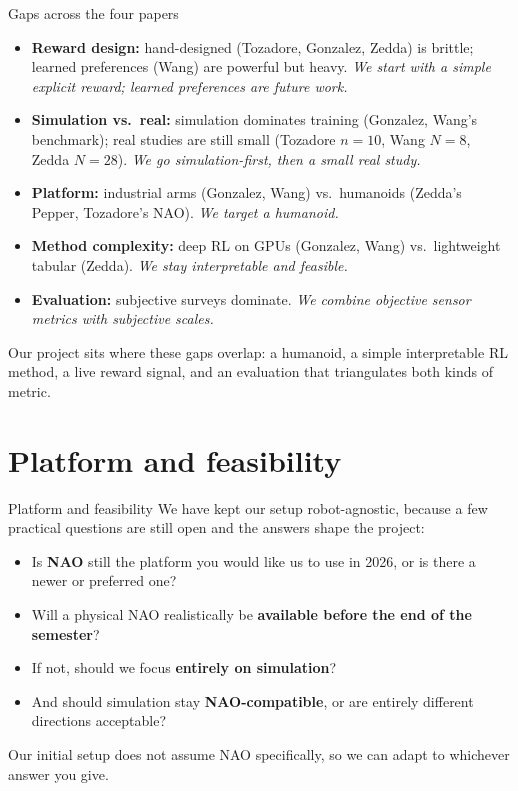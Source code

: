 \documentclass[aspectratio=169,10pt]{beamer}
\begin{document}
\begin{frame}{Gaps across the four papers}
  \footnotesize
  \begin{itemize}
    \item \textbf{Reward design:} hand-designed (Tozadore, Gonzalez, Zedda) is brittle; learned preferences (Wang) are powerful but heavy. \emph{We start with a simple explicit reward; learned preferences are future work.}
    \item \textbf{Simulation vs.\ real:} simulation dominates training (Gonzalez, Wang's benchmark); real studies are still small (Tozadore $n{=}10$, Wang $N{=}8$, Zedda $N{=}28$). \emph{We go simulation-first, then a small real study.}
    \item \textbf{Platform:} industrial arms (Gonzalez, Wang) vs.\ humanoids (Zedda's Pepper, Tozadore's NAO). \emph{We target a humanoid.}
    \item \textbf{Method complexity:} deep RL on GPUs (Gonzalez, Wang) vs.\ lightweight tabular (Zedda). \emph{We stay interpretable and feasible.}
    \item \textbf{Evaluation:} subjective surveys dominate. \emph{We combine objective sensor metrics with subjective scales.}
  \end{itemize}
  \begin{block}{}
    \footnotesize Our project sits where these gaps overlap: a humanoid, a simple interpretable RL method, a live reward signal, and an evaluation that triangulates both kinds of metric.
  \end{block}
\end{frame}

\section{Platform and feasibility}

\begin{frame}{Platform and feasibility}
  We have kept our setup robot-agnostic, because a few practical questions are still open and the answers shape the project:
  \begin{itemize}
    \item Is \textbf{NAO} still the platform you would like us to use in 2026, or is there a newer or preferred one?
    \item Will a physical NAO realistically be \textbf{available before the end of the semester}?
    \item If not, should we focus \textbf{entirely on simulation}?
    \item And should simulation stay \textbf{NAO-compatible}, or are entirely different directions acceptable?
  \end{itemize}
  \vspace{0.3em}
  \begin{block}{}
    \footnotesize Our initial setup does not assume NAO specifically, so we can adapt to whichever answer you give.
  \end{block}
\end{frame}
\end{document}
